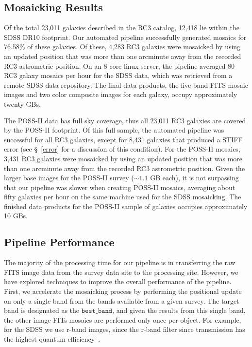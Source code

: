 \documentclass[authoryear, 12pt, 5p, times]{elsarticle}
\begin{document}
\subsection{Mosaicking Results}

Of the total 23,011 galaxies described in the RC3 catalog, 12,418 lie within the SDSS DR10 footprint. Our automated pipeline successfully generated mosaics for 76.58\% of these galaxies. Of these, 4,283 RC3 galaxies were mosaicked by using an updated position that was more than one arcminute away from the recorded RC3 astrometric position. On an 8-core linux server, the pipeline averaged 80 RC3 galaxy mosaics per hour for the SDSS data, which was retrieved from a remote SDSS data repository. The final data products, the five band FITS mosaic images and two color composite images for each galaxy, occupy approximately twenty GBs.

The POSS-II data has full sky coverage, thus all 23,011 RC3 galaxies are covered by the POSS-II footprint. Of this full sample, the automated pipeline was successful for all RC3 galaxies, except for 8,431 galaxies that produced a STIFF error (see \S~\ref{error} for a discussion of this condition). For the POSS-II mosaics, 3,431 RC3 galaxies were mosaicked by using an updated position that was more than one arcminute away from the recorded RC3 astrometric position. Given the larger base images for the POSS-II survey ($\sim1.1$ GB each), it is not surpassing that our pipeline was slower when creating POSS-II mosaics, averaging about fifty galaxies per hour on the same machine used for the SDSS mosaicking. The finished data products for the POSS-II sample of galaxies occupies approximately 10 GBs.

\subsection{Pipeline Performance}	

The majority of the processing time for our pipeline is in transferring the raw FITS image data from the survey data site to the processing site. However, we have explored techniques to improve the overall performance of the pipeline. First, we accelerate the mosaicking process by performing the positional update on only a single band from the bands available from a given survey. The target band is designated as the $\texttt{best\_band}$, and given the results from this single band, the other image FITs mosaics are performed only once per object. For example, for the SDSS we use r-band images, since the r-band filter since transmission has the highest quantum efficiency~\citep{edr}.
\end{document}
